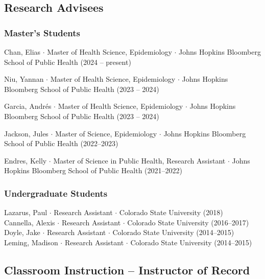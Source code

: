 \documentclass{cv}
\begin{document}
\subsection*{Research Advisees}


\subsubsection*{Master's Students}

Chan, Elias $\cdot$ Master of Health Science, Epidemiology $\cdot$ Johns Hopkins Bloomberg School of Public Health (2024 -- present)

Niu, Yannan $\cdot$ Master of Health Science, Epidemiology $\cdot$ Johns Hopkins Bloomberg School of Public Health (2023 -- 2024)

Garcia, Andrés $\cdot$ Master of Health Science, Epidemiology $\cdot$ Johns Hopkins Bloomberg School of Public Health (2023 -- 2024)

Jackson, Jules $\cdot$ Master of Science, Epidemiology $\cdot$ Johns Hopkins Bloomberg School of Public Health (2022--2023)

Endres, Kelly $\cdot$ Master of Science in Public Health, Research Assistant $\cdot$ Johns Hopkins Bloomberg School of Public Health (2021--2022)

\subsubsection*{Undergraduate Students}

Lazarus, Paul $\cdot$ Research Assistant $\cdot$ Colorado State University (2018) \\
Cannella, Alexis $\cdot$ Research Assistant $\cdot$ Colorado State University (2016--2017) \\
Doyle, Jake $\cdot$ Research Assistant $\cdot$ Colorado State University (2014--2015) \\
Leming, Madison $\cdot$ Research Assistant $\cdot$ Colorado State University (2014--2015)

\subsection*{Classroom Instruction -- Instructor of Record}
\end{document}
